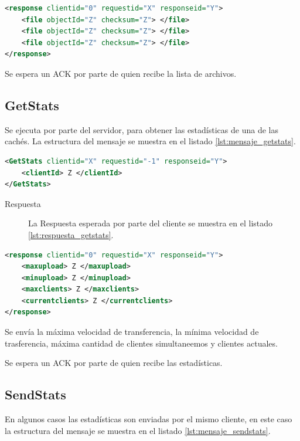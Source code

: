 \begin{lstlisting}[language=XML,caption={Mensaje de Respuesta de GetListOfFiles},label={lst:respuesta_getlistoffiles}]
<response clientid="0" requestid="X" responseid="Y"> 
	<file objectId="Z" checksum="Z"> </file>
	<file objectId="Z" checksum="Z"> </file>
	<file objectId="Z" checksum="Z"> </file>
</response>
\end{lstlisting}

Se espera un ACK por parte de quien recibe la lista de archivos.

\subsection{GetStats}
Se ejecuta por parte del servidor, para obtener las estadísticas de una de las cachés. La estructura del mensaje se muestra en el listado \ref{lst:mensaje_getstats}.

\begin{lstlisting}[language=XML,caption={Mensaje de GetStats},label={lst:mensaje_getstats}]
<GetStats clientid="X" requestid="-1" responseid="Y"> 
	<clientId> Z </clientId>
</GetStats>
\end{lstlisting}



\begin{description}
\item[Respuesta] La Respuesta esperada por parte del cliente se muestra en el listado \ref{lst:respuesta_getstats}.
\end{description}

\begin{lstlisting}[language=XML,caption={Mensaje de Respuesta de GetStats},label={lst:respuesta_getstats}]
<response clientid="0" requestid="X" responseid="Y"> 
	<maxupload> Z </maxupload>
	<minupload> Z </minupload>
	<maxclients> Z </maxclients>
	<currentclients> Z </currentclients>
</response>
\end{lstlisting}

Se envía la máxima velocidad de transferencia, la mínima velocidad de trasferencia, máxima cantidad de clientes simultaneemos y clientes actuales.

Se espera un ACK por parte de quien recibe las estadísticas.

\subsection{SendStats}

En algunos casos las estadísticas son enviadas por el mismo cliente, en este caso la estructura del mensaje se muestra en el listado \ref{lst:mensaje_sendstats}.

